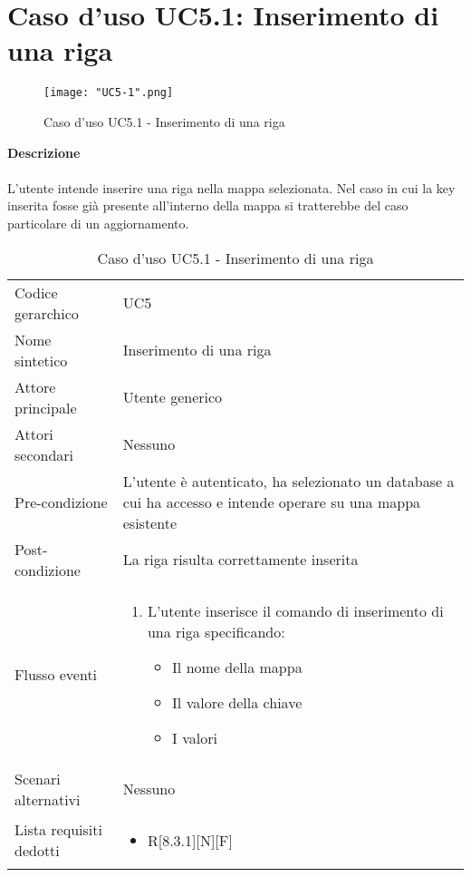 \documentclass[a4paper]{report}
\begin{document}
	 \section{Caso d'uso UC5.1: Inserimento di una riga}
	 \begin{figure}[H]
			\centering
			\texttt{[image: "UC5-1".png]}
			\caption{Caso d'uso UC5.1 - Inserimento di una riga}
		\end{figure}
	 \textbf{Descrizione} \\ \\
	 L'utente intende inserire una riga nella mappa selezionata. Nel caso in cui la key inserita
	 fosse già presente all'interno della mappa si tratterebbe del caso particolare di un aggiornamento.
		\begin{table}[H]
		\begin{tabularx}{\textwidth}{X | X}\toprule
			\rowcolor{orange!65}Codice gerarchico & UC5\\
			Nome sintetico & Inserimento di una riga\\
			\rowcolor{orange!65}Attore principale & Utente generico\\
			Attori secondari & Nessuno \\
			\rowcolor{orange!65}Pre-condizione & L'utente è autenticato, ha selezionato un database a cui ha 
			accesso e intende operare su una mappa esistente \\
			Post-condizione & La riga risulta correttamente inserita\\
			\rowcolor{orange!65}Flusso eventi & \begin{enumerate}
			\item L'utente inserisce il comando di inserimento di una riga specificando:
			\begin{itemize}
				\item Il nome della mappa
				\item Il valore della chiave
				\item I valori
			\end{itemize}
			\end{enumerate} \\
			Scenari alternativi & Nessuno \\
			\rowcolor{orange!65}Lista requisiti dedotti & \begin{itemize}
				\item R[8.3.1][N][F]
				\end{itemize} \\
			\bottomrule
		\end{tabularx}
		\caption{Caso d'uso UC5.1 - Inserimento di una riga}
	 \end{table}
\end{document}
